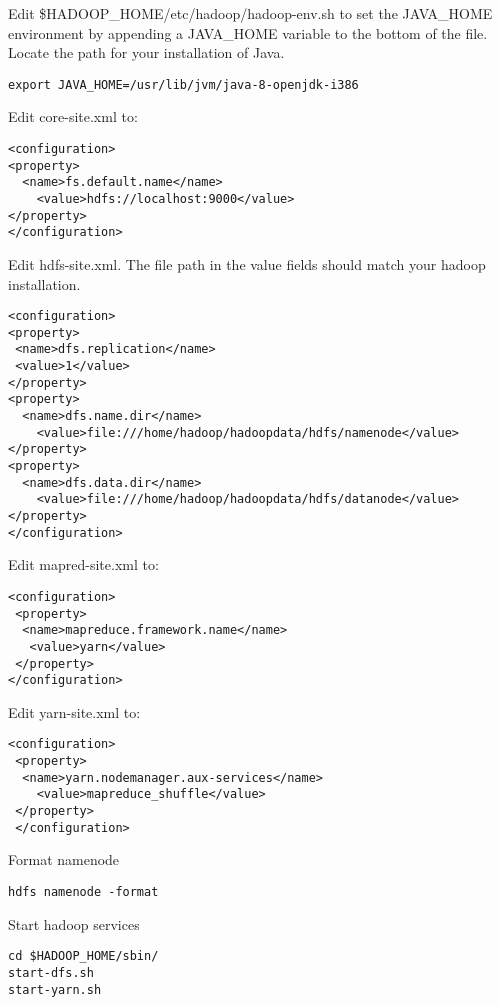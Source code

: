Edit \$HADOOP\_HOME/etc/hadoop/hadoop-env.sh to set the JAVA\_HOME
environment by appending a JAVA\_HOME variable to the bottom of the
file. Locate the path for your installation of Java.

\begin{lstlisting}
export JAVA_HOME=/usr/lib/jvm/java-8-openjdk-i386
\end{lstlisting}

Edit core-site.xml to:

\begin{lstlisting}
<configuration>
<property>
  <name>fs.default.name</name>
    <value>hdfs://localhost:9000</value>
</property>
</configuration>
\end{lstlisting}

Edit hdfs-site.xml. The file path in the value fields should match your
hadoop installation.

\begin{lstlisting}
<configuration>
<property>
 <name>dfs.replication</name>
 <value>1</value>
</property>
<property>
  <name>dfs.name.dir</name>
    <value>file:///home/hadoop/hadoopdata/hdfs/namenode</value>
</property>
<property>
  <name>dfs.data.dir</name>
    <value>file:///home/hadoop/hadoopdata/hdfs/datanode</value>
</property>
</configuration>
\end{lstlisting}

Edit mapred-site.xml to:

\begin{lstlisting}
<configuration>
 <property>
  <name>mapreduce.framework.name</name>
   <value>yarn</value>
 </property>
</configuration>
\end{lstlisting}

Edit yarn-site.xml to:

\begin{lstlisting}
<configuration>
 <property>
  <name>yarn.nodemanager.aux-services</name>
    <value>mapreduce_shuffle</value>
 </property>
 </configuration>
\end{lstlisting}

Format namenode

\begin{lstlisting}
hdfs namenode -format
\end{lstlisting}

Start hadoop services

\begin{lstlisting}
cd $HADOOP_HOME/sbin/
start-dfs.sh
start-yarn.sh
\end{lstlisting}

